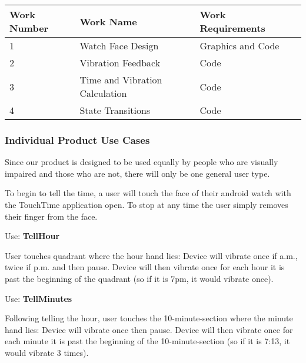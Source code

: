 \documentclass[12pt, titlepage]{article}
\begin{document}
\begin{center}
    \begin{tabular}{| l | l | l | p{5cm} | }
    \hline
    Work Number & Work Name & Work Requirements \\ \hline
    1 & Watch Face Design & Graphics and Code \\ \hline
    2 & Vibration Feedback & Code \\ \hline
    3 & Time and Vibration Calculation & Code \\ \hline
    4 & State Transitions & Code \\ \hline
    \end{tabular}
\end{center}

\subsubsection{Individual Product Use Cases}

Since our product is designed to be used equally by people who are visually impaired and those who are not, there will only be one general user type.
\vspace{2mm}

To begin to tell the time, a user will touch the face of their android watch with the TouchTime application open. To stop at any time the user simply removes their finger from the face.
\vspace{2mm}

\noindent Use: \textbf{TellHour}

User touches quadrant where the hour hand lies:
    Device will vibrate once if a.m., twice if p.m. and then pause.
    Device will then vibrate once for each hour it is past the beginning of the quadrant (so if it is 7pm, it would vibrate once).
\vspace{2mm}

\noindent Use: \textbf{TellMinutes}

Following telling the hour, user touches the 10-minute-section where the minute hand lies:
    Device will vibrate once then pause.
    Device will then vibrate once for each minute it is past the beginning of the 10-minute-section (so if it is 7:13, it would vibrate 3 times).

\newpage
\end{document}
